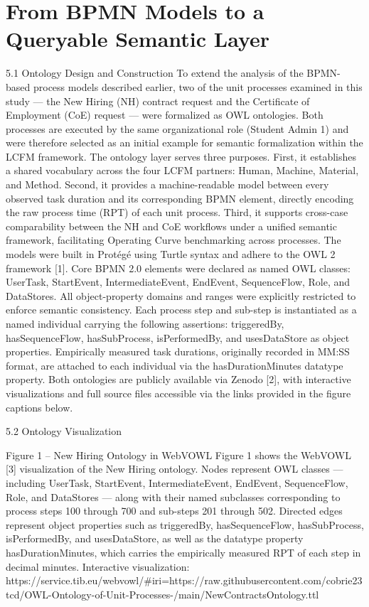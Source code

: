 \documentclass[preprint,12pt,authoryear]{elsarticle}
\begin{document}
\section{From BPMN Models to a Queryable Semantic Layer}
5.1 Ontology Design and Construction
To extend the analysis of the BPMN-based process models described earlier, two of the unit processes examined in this study — the New Hiring (NH) contract request and the Certificate of Employment (CoE) request — were formalized as OWL ontologies. Both processes are executed by the same organizational role (Student Admin 1) and were therefore selected as an initial example for semantic formalization within the LCFM framework.
The ontology layer serves three purposes. First, it establishes a shared vocabulary across the four LCFM partners: Human, Machine, Material, and Method. Second, it provides a machine-readable model between every observed task duration and its corresponding BPMN element, directly encoding the raw process time (RPT) of each unit process. Third, it supports cross-case comparability between the NH and CoE workflows under a unified semantic framework, facilitating Operating Curve benchmarking across processes.
The models were built in Protégé using Turtle syntax and adhere to the OWL 2 framework [1]. Core BPMN 2.0 elements were declared as named OWL classes: UserTask, StartEvent, IntermediateEvent, EndEvent, SequenceFlow, Role, and DataStores. All object-property domains and ranges were explicitly restricted to enforce semantic consistency.
Each process step and sub-step is instantiated as a named individual carrying the following assertions: triggeredBy, hasSequenceFlow, hasSubProcess, isPerformedBy, and usesDataStore as object properties. Empirically measured task durations, originally recorded in MM:SS format, are attached to each individual via the hasDurationMinutes datatype property. Both ontologies are publicly available via Zenodo [2], with interactive visualizations and full source files accessible via the links provided in the figure captions below.

5.2 Ontology Visualization 
 
Figure 1 – New Hiring Ontology in WebVOWL
Figure 1 shows the WebVOWL [3] visualization of the New Hiring ontology. Nodes represent OWL classes — including UserTask, StartEvent, IntermediateEvent, EndEvent, SequenceFlow, Role, and DataStores — along with their named subclasses corresponding to process steps 100 through 700 and sub-steps 201 through 502. Directed edges represent object properties such as triggeredBy, hasSequenceFlow, hasSubProcess, isPerformedBy, and usesDataStore, as well as the datatype property hasDurationMinutes, which carries the empirically measured RPT of each step in decimal minutes. Interactive visualization: https://service.tib.eu/webvowl/#iri=https://raw.githubusercontent.com/cobrie23tcd/OWL-Ontology-of-Unit-Processes-/main/NewContractsOntology.ttl
\end{document}
